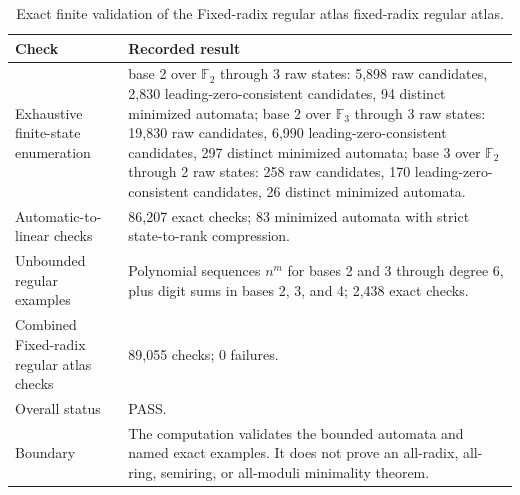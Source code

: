 \begin{table}[htbp]
\centering
\caption{Exact finite validation of the Fixed-radix regular atlas fixed-radix regular atlas.}
\label{tab:block05-validation}
\small
\begin{tabularx}{\textwidth}{@{}L{0.27\textwidth}Y@{}}
\toprule
Check & Recorded result\\
\midrule
Exhaustive finite-state enumeration & base 2 over $\mathbb F_2$ through 3 raw states: 5,898 raw candidates, 2,830 leading-zero-consistent candidates, 94 distinct minimized automata; base 2 over $\mathbb F_3$ through 3 raw states: 19,830 raw candidates, 6,990 leading-zero-consistent candidates, 297 distinct minimized automata; base 3 over $\mathbb F_2$ through 2 raw states: 258 raw candidates, 170 leading-zero-consistent candidates, 26 distinct minimized automata.\\
Automatic-to-linear checks & 86,207 exact checks; 83 minimized automata with strict state-to-rank compression.\\
Unbounded regular examples & Polynomial sequences $n^m$ for bases 2 and 3 through degree 6, plus digit sums in bases 2, 3, and 4; 2,438 exact checks.\\
Combined Fixed-radix regular atlas checks & 89,055 checks; 0 failures.\\
Overall status & PASS.\\
Boundary & The computation validates the bounded automata and named exact examples. It does not prove an all-radix, all-ring, semiring, or all-moduli minimality theorem.\\
\bottomrule
\end{tabularx}
\end{table}
